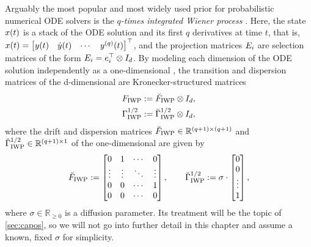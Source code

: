 \documentclass{mimosis}
\begin{document}
\begin{exmple}
Arguably the most popular and most widely used prior for probabilistic numerical ODE solvers is the \emph{\(q\)-times integrated Wiener process} .
Here, the state \(x(t)\) is a stack of the ODE solution and its first \(q\) derivatives at time \(t\),
that is,
\(x(t) = \begin{bmatrix} y(t) & \dot{y}(t) & \cdots & y^{(q)}(t) \end{bmatrix}^\top\),
and the projection matrices \(E_{i}\) are selection matrices of the form \(E_{i} = e_i^\top \otimes I_d\).
By modeling each dimension of the ODE solution independently as a one-dimensional ,
the transition and dispersion matrices of the d-dimensional  are Kronecker-structured matrices
\begin{subequations}
\begin{align}
F_\text{IWP} &:= \breve{F}_\text{IWP} \otimes I_d,
\\
\Gamma^{1/2}_\text{IWP} &:= \breve{\Gamma}^{1/2}_\text{IWP} \otimes I_d,
\end{align}
\end{subequations}
where the drift and dispersion matrices
\(\breve{F}_\text{IWP} \in \mathbb{R}^{(q+1) \times (q+1)}\) and
\(\breve{\Gamma}^{1/2}_\text{IWP} \in \mathbb{R}^{(q+1) \times 1}\)
of the one-dimensional 
are given by
\begin{equation}
\breve{F}_\text{IWP} := \begin{bmatrix}
0 & 1 & \cdots & 0 \\
\vdots & \vdots & \ddots & \vdots \\
0 & 0 & \cdots & 1 \\
0 & 0 & \cdots & 0
\end{bmatrix},
\qquad
\breve{\Gamma}^{1/2}_\text{IWP} := \sigma \cdot \begin{bmatrix}
0 \\ 0 \\ \vdots \\ 1
\end{bmatrix},
\end{equation}
where \(\sigma \in \mathbb{R}_{\geq0}\) is a diffusion parameter.
Its treatment will be the topic of \cref{sec:capos}, so we will not go into further detail in this chapter and assume a known, fixed \(\sigma\) for simplicity.


\end{exmple}
\end{document}
